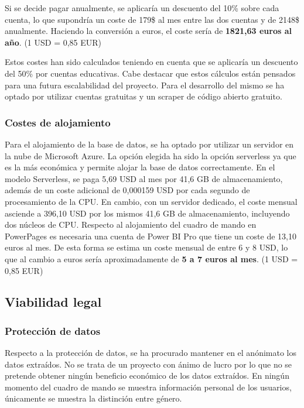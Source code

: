 Si se decide pagar anualmente, se aplicaría un descuento del 10\% sobre cada cuenta, lo que supondría un coste de 179\$ al mes entre las dos cuentas y de 2148\$ anualmente.
Haciendo la conversión a euros, el coste sería de \textbf{1821,63 euros al año}. (1 USD = 0,85 EUR) 

Estos costes han sido calculados teniendo en cuenta que se aplicaría un descuento del 50\% por cuentas educativas.
Cabe destacar que estos cálculos están pensados para una futura escalabilidad del proyecto. Para el desarrollo del mismo se ha optado por utilizar cuentas gratuitas y un scraper de código abierto gratuito.

\subsubsection{Costes de alojamiento}

Para el alojamiento de la base de datos, se ha optado por utilizar un servidor en la nube de Microsoft Azure.
La opción elegida ha sido la opción serverless ya que es la más económica y permite alojar la base de datos correctamente.
En el modelo Serverless, se paga 5,69 USD al mes por 41,6 GB de almacenamiento, además de un coste adicional de 0,000159 USD por cada segundo de procesamiento de la CPU. En cambio, con un servidor dedicado, el coste mensual asciende a 396,10 USD por los mismos 41,6 GB de almacenamiento, incluyendo dos núcleos de CPU.
Respecto al alojamiento del cuadro de mando en PowerPages es necesaria una cuenta de Power BI Pro que tiene un coste de 13,10 euros al mes.
De esta forma se estima un coste mensual de entre 6 y 8 USD, lo que al cambio a euros sería aproximadamente de \textbf{5 a 7 euros al mes}. (1 USD = 0,85 EUR)

\subsection{Viabilidad legal}

\subsubsection{Protección de datos}

Respecto a la protección de datos, se ha procurado mantener en el anónimato los datos extraídos. 
No se trata de un proyecto con ánimo de lucro por lo que no se pretende obtener ningún beneficio económico de los datos extraídos.
En ningún momento del cuadro de mando se muestra información personal de los usuarios, únicamente se muestra la distinción entre género.

